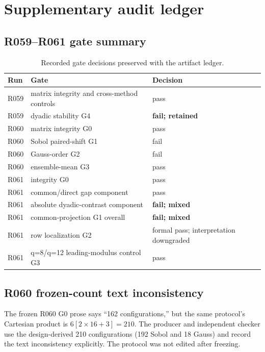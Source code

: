 \section{Supplementary audit ledger}
\label{app:audit}

\subsection{R059--R061 gate summary}

\begin{table}[H]
\centering
\caption{Recorded gate decisions preserved with the artifact ledger.}
\label{tab:gate-ledger}
\small
\begin{tabular}{lll}
\toprule
Run & Gate & Decision\\
\midrule
R059 & matrix integrity and cross-method controls & pass\\
R059 & dyadic stability G4 & \textbf{fail; retained}\\
R060 & matrix integrity G0 & pass\\
R060 & Sobol paired-shift G1 & fail\\
R060 & Gauss-order G2 & fail\\
R060 & ensemble-mean G3 & pass\\
R061 & integrity G0 & pass\\
R061 & common/direct gap component & pass\\
R061 & absolute dyadic-contrast component & \textbf{fail; mixed}\\
R061 & common-projection G1 overall & \textbf{fail; mixed}\\
R061 & row localization G2 & formal pass; interpretation downgraded\\
R061 & q=8/q=12 leading-modulus control G3 & pass\\
\bottomrule
\end{tabular}
\end{table}

\subsection{R060 frozen-count text inconsistency}

The frozen R060 G0 prose says ``162 configurations,'' but the same protocol's
Cartesian product is
$6[2\times16+3]=210$.  The producer and independent checker use the
design-derived 210 configurations (192 Sobol and 18 Gauss) and record the text
inconsistency explicitly.  The protocol was not edited after freezing.

